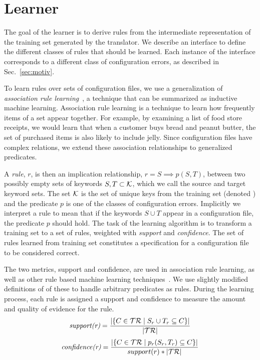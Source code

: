\section{Learner}
\label{sec-learn}

The goal of the learner is to derive rules from the intermediate representation of the training set generated by the translator.
We describe an interface to define the different classes of rules that should be learned.
Each instance of the interface corresponds to a different class of configuration errors, as described in Sec.~\ref{sec:motiv}.

To learn rules over sets of configuration files, we use a generalization of \textit{association rule learning}~\cite{agrawal1993mining}, a technique that can be summarized as inductive machine learning.
Association rule learning is a technique to learn how frequently items of a set appear together.
For example, by examining a list of food store receipts, we would learn that when a customer buys bread and peanut butter, the set of purchased items is also likely to include jelly.
Since configuration files have complex relations, we extend these association relationships to generalized predicates.

A \textit{rule}, $r$, is then an implication relationship, $r = S \implies p(S,T)$, between two possibly empty sets of keywords $S,T \subset \mathcal{K}$, which we call the source and target keyword sets.
The set $\mathcal{K}$ is the set of unique keys from the training set (denoted \trainingSet) and the predicate $p$ is one of the classes of configuration errors.
Implicitly we interpret a rule to mean that if the keywords $S\cup T$ appear in a configuration file, the predicate $p$ should hold.
The task of the learning algorithm is to transform a training set to a set of rules, weighted with \textit{support} and \textit{confidence}.
The set of rules learned from training set \trainingSet constitutes a specification for a configuration file to be considered correct.

The two metrics, support and confidence, are used in association rule learning, as well as other rule based machine learning techniques~\cite{han2007frequent,langley1995applications}.
We use slightly modified definitions of of these to handle arbitrary predicates as rules.
During the learning process, each rule is assigned a support and confidence to measure the amount and quality of evidence for the rule.
%
\begin{equation*}
 \textit{support(r)} = \frac{|\{C \in \mathcal{TR} \mid S_r \cup T_r \subseteq C\}|} {|\mathcal{TR}|}
\end{equation*}
\begin{equation*}
 \textit{confidence(r)} = \frac{|\{C \in \mathcal{TR} \mid p_r(S_r,T_r) \subseteq C\}| } {support(r)*|\mathcal{TR}|}
\end{equation*}

